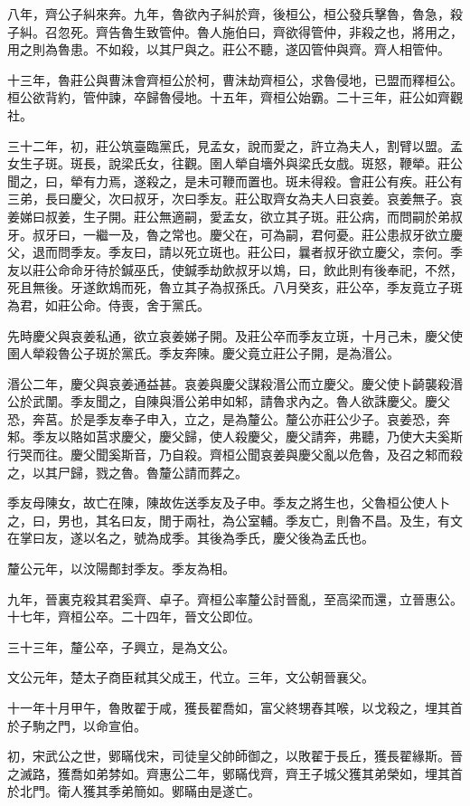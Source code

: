 八年，齊公子糾來奔。九年，魯欲內子糾於齊，後桓公，桓公發兵擊魯，魯急，殺子糾。召忽死。齊告魯生致管仲。魯人施伯曰，齊欲得管仲，非殺之也，將用之，用之則為魯患。不如殺，以其尸與之。莊公不聽，遂囚管仲與齊。齊人相管仲。

十三年，魯莊公與曹沬會齊桓公於柯，曹沬劫齊桓公，求魯侵地，已盟而釋桓公。桓公欲背約，管仲諫，卒歸魯侵地。十五年，齊桓公始霸。二十三年，莊公如齊觀社。

三十二年，初，莊公筑臺臨黨氏，見孟女，說而愛之，許立為夫人，割臂以盟。孟女生子斑。斑長，說梁氏女，往觀。圉人犖自墻外與梁氏女戲。斑怒，鞭犖。莊公聞之，曰，犖有力焉，遂殺之，是未可鞭而置也。斑未得殺。會莊公有疾。莊公有三弟，長曰慶父，次曰叔牙，次曰季友。莊公取齊女為夫人曰哀姜。哀姜無子。哀姜娣曰叔姜，生子開。莊公無適嗣，愛孟女，欲立其子斑。莊公病，而問嗣於弟叔牙。叔牙曰，一繼一及，魯之常也。慶父在，可為嗣，君何憂。莊公患叔牙欲立慶父，退而問季友。季友曰，請以死立斑也。莊公曰，曩者叔牙欲立慶父，柰何。季友以莊公命命牙待於鍼巫氏，使鍼季劫飲叔牙以鴆，曰，飲此則有後奉祀，不然，死且無後。牙遂飲鴆而死，魯立其子為叔孫氏。八月癸亥，莊公卒，季友竟立子斑為君，如莊公命。侍喪，舍于黨氏。

先時慶父與哀姜私通，欲立哀姜娣子開。及莊公卒而季友立斑，十月己未，慶父使圉人犖殺魯公子斑於黨氏。季友奔陳。慶父竟立莊公子開，是為湣公。

湣公二年，慶父與哀姜通益甚。哀姜與慶父謀殺湣公而立慶父。慶父使卜齮襲殺湣公於武闈。季友聞之，自陳與湣公弟申如邾，請魯求內之。魯人欲誅慶父。慶父恐，奔莒。於是季友奉子申入，立之，是為釐公。釐公亦莊公少子。哀姜恐，奔邾。季友以賂如莒求慶父，慶父歸，使人殺慶父，慶父請奔，弗聽，乃使大夫奚斯行哭而往。慶父聞奚斯音，乃自殺。齊桓公聞哀姜與慶父亂以危魯，及召之邾而殺之，以其尸歸，戮之魯。魯釐公請而葬之。

季友母陳女，故亡在陳，陳故佐送季友及子申。季友之將生也，父魯桓公使人卜之，曰，男也，其名曰友，閒于兩社，為公室輔。季友亡，則魯不昌。及生，有文在掌曰友，遂以名之，號為成季。其後為季氏，慶父後為孟氏也。

釐公元年，以汶陽鄪封季友。季友為相。

九年，晉裏克殺其君奚齊、卓子。齊桓公率釐公討晉亂，至高梁而還，立晉惠公。十七年，齊桓公卒。二十四年，晉文公即位。

三十三年，釐公卒，子興立，是為文公。

文公元年，楚太子商臣弒其父成王，代立。三年，文公朝晉襄父。

十一年十月甲午，魯敗翟于咸，獲長翟喬如，富父終甥舂其喉，以戈殺之，埋其首於子駒之門，以命宣伯。

初，宋武公之世，鄋瞞伐宋，司徒皇父帥師御之，以敗翟于長丘，獲長翟緣斯。晉之滅路，獲喬如弟棼如。齊惠公二年，鄋瞞伐齊，齊王子城父獲其弟榮如，埋其首於北門。衛人獲其季弟簡如。鄋瞞由是遂亡。

